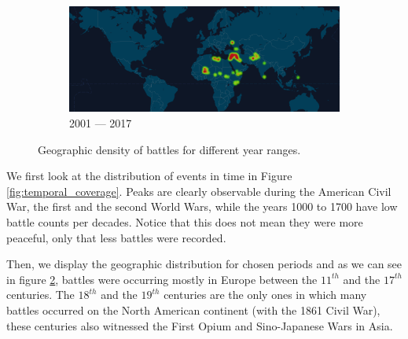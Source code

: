 \begin{figure}[!t]
\begin{subfigure}[b]{0.495\linewidth}
		\centering 
		\includegraphics[width=\linewidth]{figures/2000-2018.png}
		\caption[]%
		{{\small 2001 --- 2017 }}    
		\label{fig:geodens_2000-2017}
	\end{subfigure}
	\baselineskip
	\caption{\small Geographic density of battles for different year ranges.} 
	\label{fig:geodens}
\end{figure}

We first look at the distribution of events in time in Figure \ref{fig:temporal_coverage}. Peaks are clearly observable during the American Civil War, the first and the second World Wars,  while the years 1000 to 1700 have low battle counts per decades. Notice that this does not mean they were more peaceful, only that less battles were recorded.

Then, we display the geographic distribution for chosen periods and as we can see in figure \ref{fig:geodens}, battles were occurring mostly in Europe between the $11^{th}$ and the $17^{th}$ centuries. The $18^{th}$ and the $19^{th}$ centuries are the only ones in which many battles occurred on the North American continent (with the 1861 Civil War), these centuries also witnessed the First Opium and Sino-Japanese Wars in Asia. 